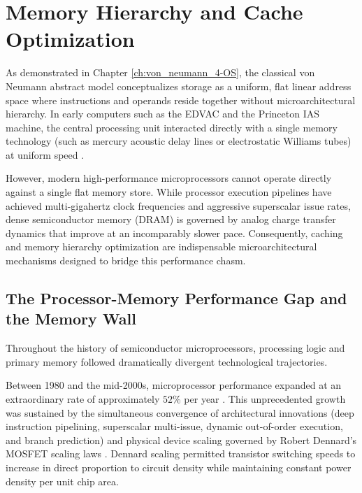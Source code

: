 \section{Memory Hierarchy and Cache Optimization}\label{sec:memory_optimization}

As demonstrated in Chapter \ref{ch:von_neumann_4-OS}, the classical von Neumann abstract model conceptualizes storage as a uniform, flat linear address space where instructions and operands reside together without microarchitectural hierarchy. In early computers such as the EDVAC and the Princeton IAS machine, the central processing unit interacted directly with a single memory technology (such as mercury acoustic delay lines or electrostatic Williams tubes) at uniform speed \cite{vonNeumann1945}.

However, modern high-performance microprocessors cannot operate directly against a single flat memory store. While processor execution pipelines have achieved multi-gigahertz clock frequencies and aggressive superscalar issue rates, dense semiconductor memory (DRAM) is governed by analog charge transfer dynamics that improve at an incomparably slower pace. Consequently, caching and memory hierarchy optimization are indispensable microarchitectural mechanisms designed to bridge this performance chasm.

\subsection{The Processor-Memory Performance Gap and the Memory Wall}\label{sec:memory_wall}

Throughout the history of semiconductor microprocessors, processing logic and primary memory followed dramatically divergent technological trajectories.

Between 1980 and the mid-2000s, microprocessor performance expanded at an extraordinary rate of approximately $52\%$ per year \cite{Hennessy19}. This unprecedented growth was sustained by the simultaneous convergence of architectural innovations (deep instruction pipelining, superscalar multi-issue, dynamic out-of-order execution, and branch prediction) and physical device scaling governed by Robert Dennard's MOSFET scaling laws \cite{dennard1974}. Dennard scaling permitted transistor switching speeds to increase in direct proportion to circuit density while maintaining constant power density per unit chip area.

